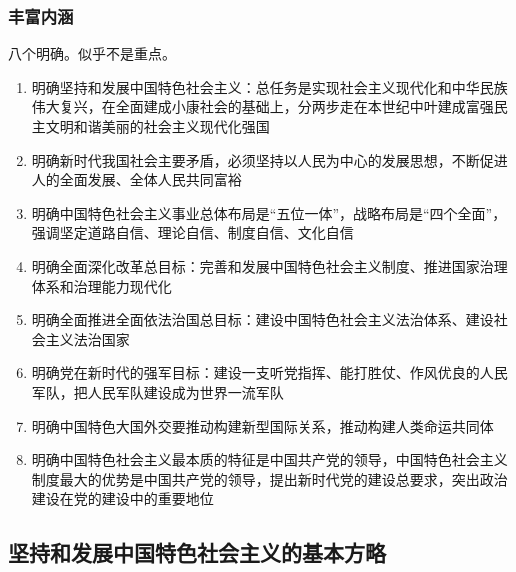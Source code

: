         \subsubsection{丰富内涵}
        八个明确。似乎不是重点。
        \begin{enumerate}
            \item 明确坚持和发展中国特色社会主义：总任务是实现社会主义现代化和中华民族伟大复兴，在全面建成小康社会的基础上，分两步走在本世纪中叶建成富强民主文明和谐美丽的社会主义现代化强国
            \item 明确新时代我国社会主要矛盾，必须坚持以人民为中心的发展思想，不断促进人的全面发展、全体人民共同富裕
            \item 明确中国特色社会主义事业总体布局是“五位一体”，战略布局是“四个全面”，强调坚定道路自信、理论自信、制度自信、文化自信
            \item 明确全面深化改革总目标：完善和发展中国特色社会主义制度、推进国家治理体系和治理能力现代化
            \item 明确全面推进全面依法治国总目标：建设中国特色社会主义法治体系、建设社会主义法治国家
            \item 明确党在新时代的强军目标：建设一支听党指挥、能打胜仗、作风优良的人民军队，把人民军队建设成为世界一流军队
            \item 明确中国特色大国外交要推动构建新型国际关系，推动构建人类命运共同体
            \item 明确中国特色社会主义最本质的特征是中国共产党的领导，中国特色社会主义制度最大的优势是中国共产党的领导，提出新时代党的建设总要求，突出政治建设在党的建设中的重要地位
        \end{enumerate}

    \subsection{坚持和发展中国特色社会主义的基本方略}
